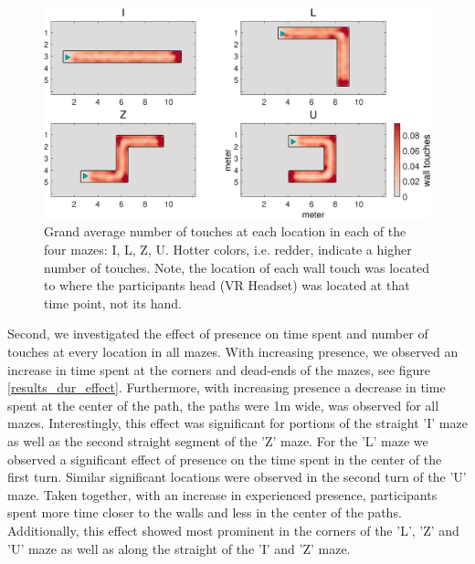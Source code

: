 \begin{figure}[h]
\centering
\includegraphics[width=\linewidth]{figures/wall_touches_mean.eps}
\vspace{0pt}
\caption{Grand average number of touches at each location in each of the four mazes: I, L, Z, U. Hotter colors, i.e. redder, indicate a higher number of touches. Note, the location of each wall touch was located to where the participants head (VR Headset) was located at that time point, not its hand.}
\label{results_touches_mean}
\end{figure}

Second, we investigated the effect of presence on time spent and number of touches at every location in all mazes. With increasing presence, we observed an increase in time spent at the corners and dead-ends of the mazes, see figure \ref{results_dur_effect}. Furthermore, with increasing presence a decrease in time spent at the center of the path, the paths were 1m wide, was observed for all mazes. Interestingly, this effect was significant for portions of the straight 'I' maze as well as the second straight segment of the 'Z' maze. For the 'L' maze we observed a significant effect of presence on the time spent in the center of the first turn. Similar significant locations were observed in the second turn of the 'U' maze. Taken together, with an increase in experienced presence, participants spent more time closer to the walls and less in the center of the paths. Additionally, this effect showed most prominent in the corners of the 'L', 'Z' and 'U' maze as well as along the straight of the 'I' and 'Z' maze.

